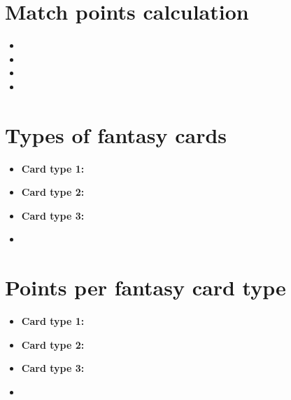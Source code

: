 \documentclass[11pt,a4paper]{article}
\begin{document}
\section{Match points calculation}
\begin{itemize}
\item %
\item %
\item %
\item %
\end{itemize}

\section{Types of fantasy cards}
\begin{itemize}
\item \textbf{Card type 1:} %
\item \textbf{Card type 2:} %
\item \textbf{Card type 3:} %
\item %
\end{itemize}

\section{Points per fantasy card type}
\begin{itemize}
\item \textbf{Card type 1:} %
\item \textbf{Card type 2:} %
\item \textbf{Card type 3:} %
\item %
\end{itemize}
\end{document}
